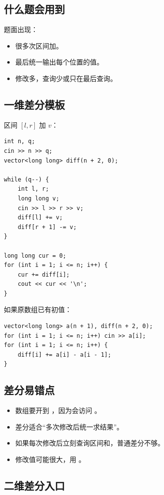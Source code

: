 \subsection{什么题会用到}

题面出现：

\begin{itemize}
  \item 很多次区间加。
  \item 最后统一输出每个位置的值。
  \item 修改多，查询少或只在最后查询。
\end{itemize}

\subsection{一维差分模板}

区间 $[l,r]$ 加 $v$：

\begin{lstlisting}
int n, q;
cin >> n >> q;
vector<long long> diff(n + 2, 0);

while (q--) {
    int l, r;
    long long v;
    cin >> l >> r >> v;
    diff[l] += v;
    diff[r + 1] -= v;
}

long long cur = 0;
for (int i = 1; i <= n; i++) {
    cur += diff[i];
    cout << cur << '\n';
}
\end{lstlisting}

如果原数组已有初值：

\begin{lstlisting}
vector<long long> a(n + 1), diff(n + 2, 0);
for (int i = 1; i <= n; i++) cin >> a[i];
for (int i = 1; i <= n; i++) {
    diff[i] += a[i] - a[i - 1];
}
\end{lstlisting}

\subsection{差分易错点}

\begin{itemize}
  \item 数组要开到 ，因为会访问 。
  \item 差分适合“多次修改后统一求结果”。
  \item 如果每次修改后立刻查询区间和，普通差分不够。
  \item 修改值可能很大，用 。
\end{itemize}

\subsection{二维差分入口}

